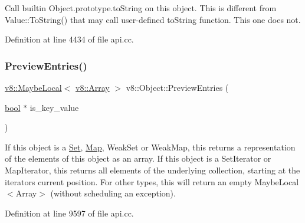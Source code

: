 Call builtin Object.\+prototype.\+to\+String on this object. This is different from Value\+::\+To\+String() that may call user-\/defined to\+String function. This one does not. 

Definition at line 4434 of file api.\+cc.

\mbox{\label{classv8_1_1Object_a8ed690cfca5d1cc2667b334f8122f6d2}} 
\subsubsection{\texorpdfstring{Preview\+Entries()}{PreviewEntries()}}
{\footnotesize\ttfamily \mbox{\hyperlink{classv8_1_1MaybeLocal}{v8\+::\+Maybe\+Local}}$<$ \mbox{\hyperlink{classv8_1_1Array}{v8\+::\+Array}} $>$ v8\+::\+Object\+::\+Preview\+Entries (\begin{DoxyParamCaption}\item[{\mbox{\hyperlink{classbool}{bool}} $\ast$}]{is\+\_\+key\+\_\+value }\end{DoxyParamCaption})}

If this object is a \mbox{\hyperlink{classv8_1_1Set}{Set}}, \mbox{\hyperlink{classv8_1_1Map}{Map}}, Weak\+Set or Weak\+Map, this returns a representation of the elements of this object as an array. If this object is a Set\+Iterator or Map\+Iterator, this returns all elements of the underlying collection, starting at the iterator\textquotesingle{}s current position. For other types, this will return an empty Maybe\+Local$<$\+Array$>$ (without scheduling an exception). 

Definition at line 9597 of file api.\+cc.

\mbox{\label{classv8_1_1Object_a3fb94f6679be1479ee19cc21e33ccb12}} 
